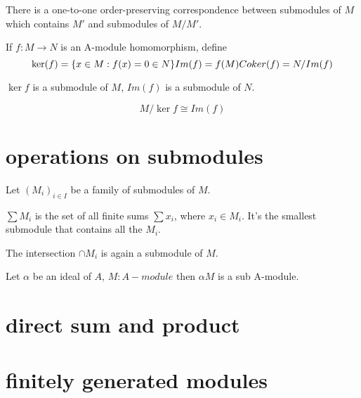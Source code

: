 \documentclass[11pt,fleqn]{book} %
\begin{document}
\begin{CJK}{UTF8}{gkai}
\begin{proposition}
	 There is a one-to-one order-preserving correspondence between submodules of $M$ which contains $M'$ and submodules of $M/M'$.
\end{proposition}

\begin{definition}
	 If $f:M\to N$ is an A-module homomorphism, define 
	\[
		\ker(f) = \{x\in M: f(x) = 0\in N\}\\
		Im(f) = f(M)\\
		Coker (f) = N/Im(f)\]
\end{definition}
\begin{proposition}
	$\ker f$ is a submodule of $M$, $Im(f)$ is a submodule of $N$.
\end{proposition}
\begin{proposition}
	\[
		M/\ker f \cong Im(f)\]
\end{proposition}

\section{operations on submodules}
Let $(M_i)_{i\in I}$ be a family of submodules of $M$.
\begin{definition}
	[sum] $\sum M_i$ is the set of all finite sums $\sum x_i$, where $x_i \in M_i$. It's the smallest submodule that contains all the $M_i$.
\end{definition}

\begin{definition}
	[intersection] The intersection $\cap M_i$ is again a submodule of $M$. 
\end{definition}

\begin{definition}
	Let $\alpha$ be an ideal of $A$, $M: A-module$ then $\alpha M$ is a sub A-module. 
\end{definition}

\begin{definition}
	[annihilator]
\end{definition}

\section{direct sum and product}

\section{finitely generated modules}


\end{CJK}
\end{document}
